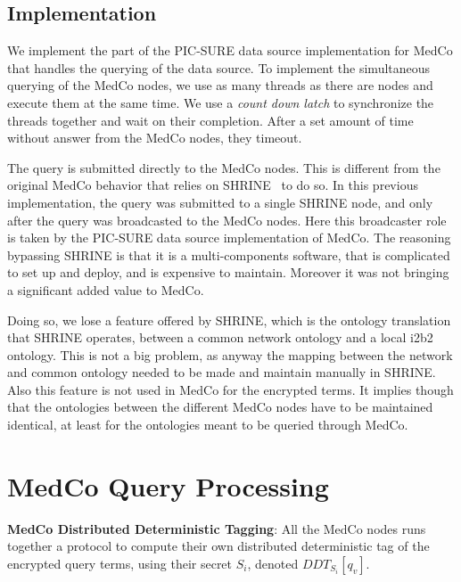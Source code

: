 
\subsection*{Implementation}

We implement the part of the PIC-SURE data source implementation for MedCo that handles the querying of the data source.
To implement the simultaneous querying of the MedCo nodes, we use as many threads as there are nodes and execute them at the same time. 
We use a \emph{count down latch} to synchronize the threads together and wait on their completion.
After a set amount of time without answer from the MedCo nodes, they timeout.

The query is submitted directly to the MedCo nodes. 
This is different from the original MedCo behavior that relies on SHRINE~\cite{todo} to do so.
In this previous implementation, the query was submitted to a single SHRINE node, and only after the query was broadcasted to the MedCo nodes.
Here this broadcaster role is taken by the PIC-SURE data source implementation of MedCo.
The reasoning bypassing SHRINE is that it is a multi-components software, that is complicated to set up and deploy, and is expensive to maintain.
Moreover it was not bringing a significant added value to MedCo.

Doing so, we lose a feature offered by SHRINE, which is the ontology translation that SHRINE operates, between a common network ontology and a local i2b2 ontology.
This is not a big problem, as anyway the mapping between the network and common ontology needed to be made and maintain manually in SHRINE.
Also this feature is not used in MedCo for the encrypted terms.
It implies though that the ontologies between the different MedCo nodes have to be maintained identical, at least for the ontologies meant to be queried through MedCo.

\section{MedCo Query Processing}



\label{sec:medco-process}


\item \textbf{MedCo Distributed Deterministic Tagging}:
All the MedCo nodes runs together a protocol to compute their own distributed deterministic tag of the encrypted query terms, using their secret $S_i$, denoted $DDT_{S_i}[q_v]$.

